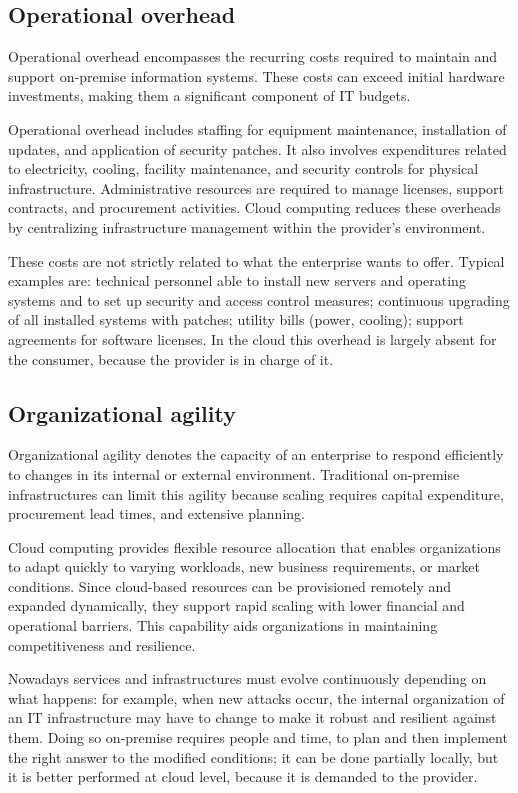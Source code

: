 \documentclass[11pt,a4paper,openany]{report}
\begin{document}
\subsection{Operational overhead}

Operational overhead encompasses the recurring costs required to maintain and support on-premise information systems. These costs can exceed initial hardware investments, making them a significant component of IT budgets.

Operational overhead includes staffing for equipment maintenance, installation of updates, and application of security patches. It also involves expenditures related to electricity, cooling, facility maintenance, and security controls for physical infrastructure. Administrative resources are required to manage licenses, support contracts, and procurement activities. Cloud computing reduces these overheads by centralizing infrastructure management within the provider's environment.

These costs are not strictly related to what the enterprise wants to offer. Typical examples are: technical personnel able to install new servers and operating systems and to set up security and access control measures; continuous upgrading of all installed systems with patches; utility bills (power, cooling); support agreements for software licenses. In the cloud this overhead is largely absent for the consumer, because the provider is in charge of it.

\subsection{Organizational agility}

Organizational agility denotes the capacity of an enterprise to respond efficiently to changes in its internal or external environment. Traditional on-premise infrastructures can limit this agility because scaling requires capital expenditure, procurement lead times, and extensive planning.

Cloud computing provides flexible resource allocation that enables organizations to adapt quickly to varying workloads, new business requirements, or market conditions. Since cloud-based resources can be provisioned remotely and expanded dynamically, they support rapid scaling with lower financial and operational barriers. This capability aids organizations in maintaining competitiveness and resilience.

Nowadays services and infrastructures must evolve continuously depending on what happens: for example, when new attacks occur, the internal organization of an IT infrastructure may have to change to make it robust and resilient against them. Doing so on-premise requires people and time, to plan and then implement the right answer to the modified conditions; it can be done partially locally, but it is better performed at cloud level, because it is demanded to the provider.
\end{document}
